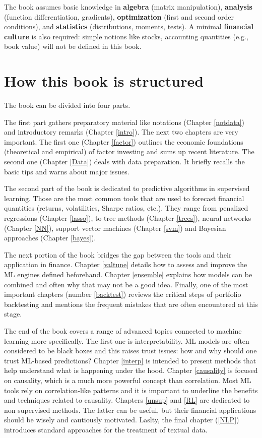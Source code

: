 \documentclass[]{krantz}
\theoremstyle{definition}
\theoremstyle{definition}
\theoremstyle{definition}
\theoremstyle{remark}
\begin{document}
The book assumes basic knowledge in \textbf{algebra} (matrix
manipulation), \textbf{analysis} (function differentiation, gradients),
\textbf{optimization} (first and second order conditions), and
\textbf{statistics} (distributions, moments, tests). A minimal
\textbf{financial culture} is also required: simple notions like stocks,
accounting quantities (e.g., book value) will not be defined in this
book.

\hypertarget{how-this-book-is-structured}{%
\section{How this book is
structured}\label{how-this-book-is-structured}}

The book can be divided into four parts.

The first part gathers preparatory material like notations (Chapter
\ref{notdata}) and introductory remarks (Chapter \ref{intro}). The next
two chapters are very important. The first one (Chapter \ref{factor})
outlines the economic foundations (theoretical and empirical) of factor
investing and sums up recent literature. The second one (Chapter
\ref{Data}) deals with data preparation. It briefly recalls the basic
tips and warns about major issues.

The second part of the book is dedicated to predictive algorithms in
supervised learning. Those are the most common tools that are used to
forecast financial quantities (returns, volatilities, Sharpe ratios,
etc.). They range from penalized regressions (Chapter \ref{lasso}), to
tree methods (Chapter \ref{trees}), neural networks (Chapter \ref{NN}),
support vector machines (Chapter \ref{svm}) and Bayesian approaches
(Chapter \ref{bayes}).

The next portion of the book bridges the gap between the tools and their
application in finance. Chapter \ref{valtune} details how to assess and
improve the ML engines defined beforehand. Chapter \ref{ensemble}
explains how models can be combined and often why that may not be a good
idea. Finally, one of the most important chapters (number
\ref{backtest}) reviews the critical steps of portfolio backtesting and
mentions the frequent mistakes that are often encountered at this stage.

The end of the book covers a range of advanced topics connected to
machine learning more specifically. The first one is interpretability.
ML models are often considered to be black boxes and this raises trust
issues: how and why should one trust ML-based predictions? Chapter
\ref{interp} is intended to present methods that help understand what is
happening under the hood. Chapter \ref{causality} is focused on
causality, which is a much more powerful concept than correlation. Most
ML tools rely on correlation-like patterns and it is important to
underline the benefits and techniques related to causality. Chapters
\ref{unsup} and \ref{RL} are dedicated to non supervised methods. The
latter can be useful, but their financial applications should be wisely
and cautiously motivated. Laslty, the final chapter (\ref{NLP})
introduces standard approaches for the treatment of textual data.
\end{document}
